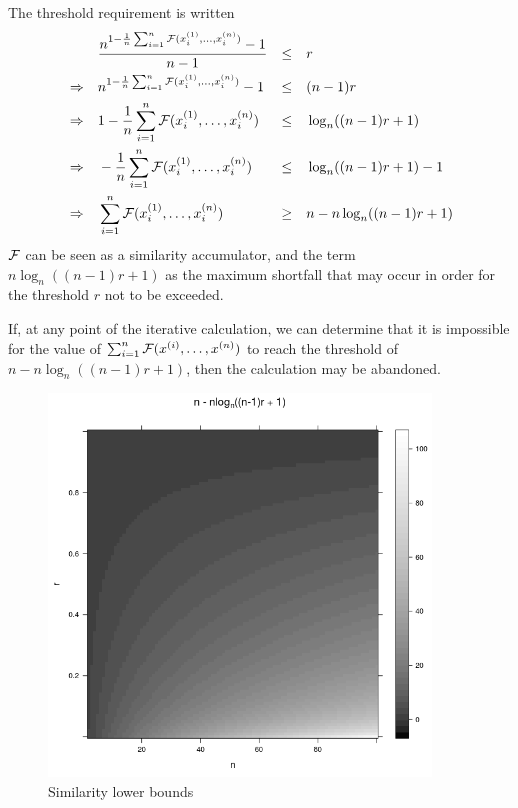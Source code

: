The threshold requirement is written
\begin{align}
&&            &\frac{n^{1 - \frac{1}{n}\sum_{i = 1}^n  \mathcal{F}(x^{(1)}_i,\ldots, x^{(n)}_i)} - 1}{n - 1}   & \leq & & &r\\
&\Rightarrow& &n^{1 - \frac{1}{n}\sum_{i = 1}^n  \mathcal{F}(x^{(1)}_i,\ldots, x^{(n)}_i)} - 1   & \leq & & &(n - 1)r\\
&\Rightarrow& &1 - \frac{1}{n} \sum_{i = 1}^n  \mathcal{F}(x^{(1)}_i,\ldots, x^{(n)}_i)          & \leq & & &\log_n((n - 1)r + 1)\\
&\Rightarrow& &- \frac{1}{n} \sum_{i = 1}^n  \mathcal{F}(x^{(1)}_i,\ldots, x^{(n)}_i)          & \leq & & &\log_n((n - 1)r + 1) - 1\\	
&\Rightarrow& &\sum_{i = 1}^n  \mathcal{F}(x^{(1)}_i,\ldots, x^{(n)}_i)                          & \geq & & &n -  n\log_n((n - 1)r + 1)	
\end{align}
$\mathcal{F}$ can be seen as a similarity accumulator, and the term $n\log_n((n - 1)r + 1)$ as the maximum shortfall that may occur in order for the threshold $r$ not to be exceeded. 

If, at any point of the iterative calculation, we can determine that it is impossible for the value of $\sum_{i = 1}^n  \mathcal{F}(x^{(i)},\ldots, x^{(n)})$ to reach the threshold of $n -  n\log_n((n - 1)r + 1)$, then the calculation may be abandoned.

\begin{figure}
  \centering
  \includegraphics[width=4in]{gfx/threshold}
  \caption[Similarity lower bounds]
   {Similarity lower bounds}
   \label{fig:threshold}
\end{figure}

